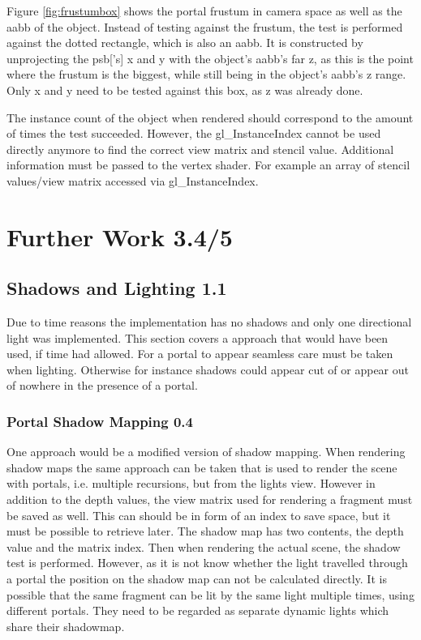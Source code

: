 Figure \ref{fig:frustumbox} shows the portal frustum in camera space as well as the \gls{aabb} of the object. Instead of testing against the frustum, the test is performed against the dotted rectangle, which is also an \gls{aabb}. It is constructed by unprojecting the \gls{psb}['s] x and y with the object's \gls{aabb}'s far z, as this is the point where the frustum is the biggest, while still being in the object's \gls{aabb}'s z range. Only x and y need to be tested against this box, as z was already done.


The instance count of the object when rendered should correspond to the amount of times the  test succeeded. However, the gl\_InstanceIndex cannot be used directly anymore to find the correct view matrix and stencil value. Additional information must be passed to the vertex shader. For example an array of stencil values/view matrix accessed via gl\_InstanceIndex.
\section{Further Work 3.4/5}







\subsection{Shadows and Lighting 1.1}
Due to time reasons the implementation has no shadows and only one directional light was implemented. This section covers a approach that would have been used, if time had allowed. For a portal to appear seamless care must be taken when lighting. Otherwise for instance shadows could appear cut of or appear out of nowhere in the presence of a portal.

\subsubsection{Portal Shadow Mapping 0.4}
One approach would be a modified version of shadow mapping. When rendering shadow maps the same approach can be taken that is used to render the scene with portals, i.e. multiple recursions, but from the lights view. However in addition to the depth values, the view matrix used for rendering a fragment must be saved as well. This can should be in form of an index to save space, but it must be possible to retrieve later. The shadow map has two contents, the depth value and the matrix index.
Then when rendering the actual scene, the shadow test is performed. However, as it is not know whether the light travelled through a portal the position on the shadow map can not be calculated directly. It is possible that the same fragment can be lit by the same light multiple times, using different portals. They need to be regarded as separate dynamic lights which share their shadowmap.

